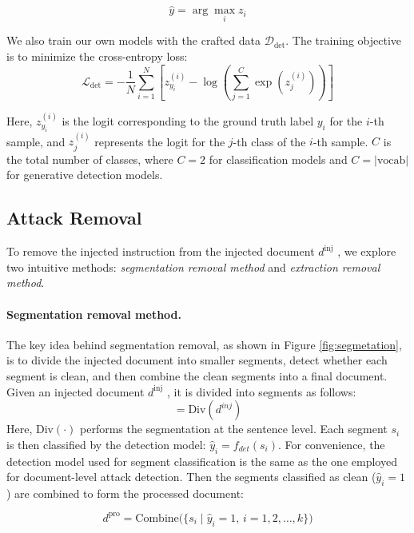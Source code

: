 \begin{equation}
    \hat{y} = \arg\max_{i} z_i
\end{equation}


We also train our own models with the crafted data $\mathcal{D}_{\text{det}}$. The training objective is to minimize the cross-entropy loss:
\begin{equation}
    \mathcal{L}_{\text{det}} = - \frac{1}{N} \sum_{i=1}^{N}   \left[z_{y_i}^{(i)} - \log\left(\sum_{j=1}^C \exp(z_j^{(i)})\right)\right]
\end{equation}

Here,  $z_{y_i}^{(i)}$  is the logit corresponding to the ground truth label  $y_i$  for the  $i$-th sample, and  $z_j^{(i)}$  represents the logit for the  $j$-th class of the  $i$-th sample.  $C$  is the total number of classes, where  $C = 2 $ for classification models and  $C = \left|\text{vocab}\right|$  for generative detection models.

\subsection{Attack Removal}
To remove the injected instruction from the injected document  $d^{\text{inj}}$ , we explore two intuitive methods: \textit{segmentation removal method} and \textit{extraction removal method}.

\paragraph{Segmentation removal method.}
The key idea behind segmentation removal, as shown in Figure \ref{fig:segmetation}, is to divide the injected document into smaller segments, detect whether each segment is clean, and then combine the clean segments into a final document.
Given an injected document  $d^{\text{inj}}$ , it is divided into segments as follows:
\begin{equation}
    [s_1, s_2, \cdots , s_{k-1}, s_k] = \text{Div}(d^{inj})
\end{equation}
Here,  $\text{Div}(\cdot)$  performs the segmentation at the sentence level. Each segment  $s_i$  is then classified by the detection model: $\hat{y}_i = f_{det}(s_i)$.
For convenience, the detection model used for segment classification is the same as the one employed for document-level attack detection.
Then the segments classified as clean ($\hat{y}_i = 1$) are combined to form the processed document:

\begin{equation}
    d^{\text{pro}} = \text{Combine}\big(\{s_i \mid \hat{y}_{i} = 1, \, i = 1, 2, \dots, k\}\big)
\end{equation}

